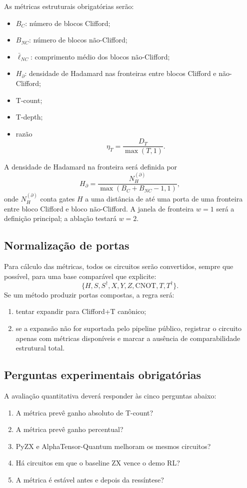 \documentclass[a4paper,11pt]{article}
\begin{document}
As métricas estruturais obrigatórias serão:
\begin{itemize}
  \item $B_C$: número de blocos Clifford;
  \item $B_{NC}$: número de blocos não-Clifford;
  \item $\bar{\ell}_{NC}$: comprimento médio dos blocos não-Clifford;
  \item $H_{\partial}$: densidade de Hadamard nas fronteiras entre blocos Clifford e não-Clifford;
  \item T-count;
  \item T-depth;
  \item razão
  \[
  \eta_T = \frac{D_T}{\max(T,1)}.
  \]
\end{itemize}

A densidade de Hadamard na fronteira será definida por
\[
H_{\partial} = \frac{N_H^{(\partial)}}{\max(B_C + B_{NC} - 1,1)},
\]
onde $N_H^{(\partial)}$ conta gates $H$ a uma distância de até uma porta de uma fronteira entre bloco Clifford e bloco não-Clifford. A janela de fronteira $w=1$ será a definição principal; a ablação testará $w=2$.

\subsection*{Normalização de portas}

Para cálculo das métricas, todos os circuitos serão convertidos, sempre que possível, para uma base comparável que explicite:
\[
\{H, S, S^\dagger, X, Y, Z, \mathrm{CNOT}, T, T^\dagger\}.
\]
Se um método produzir portas compostas, a regra será:
\begin{enumerate}
  \item tentar expandir para Clifford+T canônico;
  \item se a expansão não for suportada pelo pipeline público, registrar o circuito apenas com métricas disponíveis e marcar a ausência de comparabilidade estrutural total.
\end{enumerate}

\subsection*{Perguntas experimentais obrigatórias}

A avaliação quantitativa deverá responder às cinco perguntas abaixo:
\begin{enumerate}
  \item A métrica prevê ganho absoluto de T-count?
  \item A métrica prevê ganho percentual?
  \item PyZX e AlphaTensor-Quantum melhoram os mesmos circuitos?
  \item Há circuitos em que o baseline ZX vence o demo RL?
  \item A métrica é estável antes e depois da ressíntese?
\end{enumerate}
\end{document}
